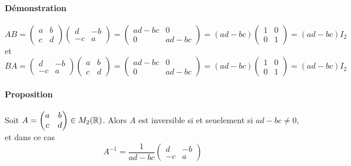 \paragraph{Démonstration} 
$$A B 
  = \begin{pmatrix} a & b \\ c & d \end{pmatrix} \begin{pmatrix} d & -b \\ -c & a \end{pmatrix} 
  = \begin{pmatrix} ad-bc & 0 \\ 0 & ad-bc \end{pmatrix} 
  = (ad-bc) \begin{pmatrix} 1 & 0 \\ 0 & 1 \end{pmatrix} 
  = (ad-bc) I_2$$
et 
$$B A 
  = \begin{pmatrix} d & -b \\ -c & a \end{pmatrix} \begin{pmatrix} a & b \\ c & d \end{pmatrix} 
  = \begin{pmatrix} ad-bc & 0 \\ 0 & ad-bc \end{pmatrix} 
  = (ad-bc) \begin{pmatrix} 1 & 0 \\ 0 & 1 \end{pmatrix} 
  = (ad-bc) I_2$$

\paragraph{Proposition} Soit $A = \begin{pmatrix} a & b \\ c & d \end{pmatrix} \in M_{2}(\mathbb{R})$. Alors $A$ est inversible si et seuelement si $a d - b c \neq 0$, et dans ce cas
$$A^{-1} = \frac{1}{a d - b c} \begin{pmatrix} d & -b \\ -c & a \end{pmatrix}$$

